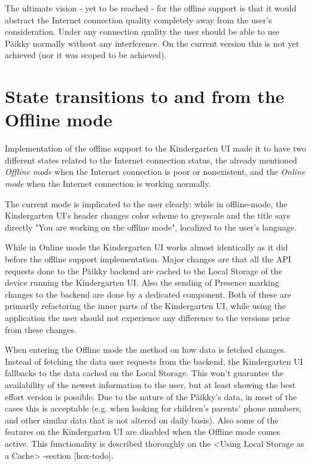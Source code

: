 The ultimate vision - yet to be reached - for the offline support is that it would abstract the Internet connection quality completely away from the user's consideration. Under any connection quality the user should be able to use Päikky normally without any interference. On the current version this is not yet achieved (nor it was scoped to be achieved). %




\section{State transitions to and from the Offline mode}

Implementation of the offline support to the Kindergarten UI made it to have two different states related to the Internet connection status, the already mentioned \textit{Offline mode} when the Internet connection is poor or nonexistent, and the \textit{Online mode} when the Internet connection is working normally. 

The current mode is implicated to the user clearly: while in offline-mode, the Kindergarten UI's header changes color scheme to greyscale and the title says directly "You are working on the offline mode", localized to the user's language.

While in Online mode the Kindergarten UI works almost identically as it did before the offline support implementation. Major changes are that all the API requests done to the Päikky backend are cached to the Local Storage of the device running the Kindergarten UI. Also the sending of Presence marking changes to the backend are done by a dedicated component. Both of these are primarily refactoring the inner parts of the Kindergarten UI, while using the application the user should not experience any difference to the versions prior from these changes.

When entering the Offline mode the method on how data is fetched changes. Instead of fetching the data user requests from the backend, the Kindergarten UI fallbacks to the data cached on the Local Storage. This won't guarantee the availability of the newest information to the user, but at least showing the best effort version is possible. Due to the nature of the Päikky's data, in most of the cases this is acceptable (e.g. when looking for children's parents' phone numbers, and other similar data that is not altered on daily basis). Also some of the features on the Kindergarten UI are disabled when the Offline mode comes active. This functionality is described thoroughly on the <Using Local Storage as a Cache> -section [hox-todo].

